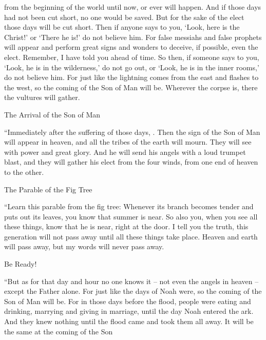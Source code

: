 {from
the beginning
of the world
until
now,
or
ever will happen.
And
if
those
days
had
not
been cut short,
no one
would
be saved.
But for the sake
of
the elect
those
days
will be cut short.
Then
if
anyone
says
to you,
‘Look,
here
is the Christ!’ or
‘There
he is!’ do
not
believe him.
For
false messiahs
and
false prophets
will appear
and
perform
great
signs
and
wonders
to
deceive,
if
possible,
even
the elect.
Remember,
I have told
you
ahead of time.
So
then, if
someone says to you,
‘Look,
he is
in
the wilderness,’
do
not
go out,
or ‘Look,
he is in
the inner rooms,’
do
not
believe him.
For
just
like the lightning
comes
from
the east
and
flashes
to
the west,
so
the coming
of the Son
of Man
will be.
Wherever
the corpse
is,
there
the vultures
will gather.
\par }{\SH The Arrival of the Son of Man
\par }{\PP {}“Immediately
after
the suffering
of those
days,
{}.
Then
the sign
of the Son
of Man
will appear
in
heaven,
and
all
the tribes
of the earth
will mourn.
They will see
{}
with
power
and
great
glory.
And
he will send
his
angels
with
a loud
trumpet
blast,
and
they will gather
his
elect
from
the four
winds,
from
one end
of heaven
to
the other.
\par }{\SH The Parable of the Fig Tree
\par }{\PP {}“Learn
this parable
from
the fig tree: Whenever
its
branch
becomes
tender
and
puts out
its leaves,
you know
that
summer
is near.
So
also
you,
when
you see
all
these things,
know
that
he is
near, right
at
the door.
I tell
you
the truth,
this
generation
will
not
pass away
until
all
these things
take place.
Heaven
and
earth
will pass away,
but
my
words
will
never
pass away.
\par }{\SH Be Ready!
\par }{\PP {}“But
as for
that
day
and
hour
no one
knows it – not even the angels in heaven – except the Father alone.
For
just
like the days
of Noah
were, so
the coming
of the Son
of Man
will be.
For
in
those
days
before
the flood,
people were eating
and
drinking,
marrying
and
giving in marriage,
until
the day
Noah
entered
the ark.
And
they knew
nothing
until
the flood
came
and
took
them all
away.
It will be
the same at the coming
of the Son
}
